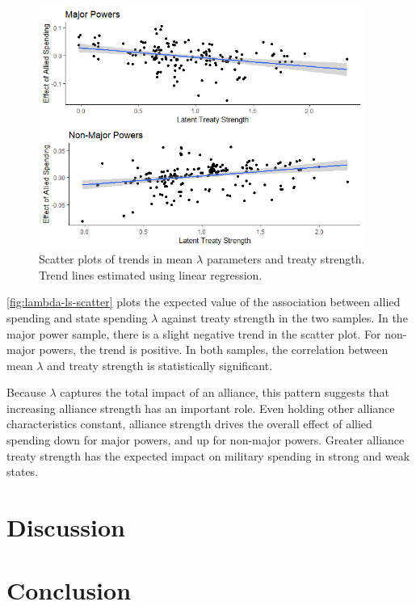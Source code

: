 \documentclass[12pt]{article}
\begin{document}
\begin{figure}[htbp]
	\centering
		\includegraphics[width=0.95\textwidth]{../figures/lambda-ls-scatter.png}
	\caption{Scatter plots of trends in mean $\lambda$ parameters and treaty strength. Trend lines estimated using linear regression. }
	\label{fig:lambda-ls-scatter}
\end{figure}


\autoref{fig:lambda-ls-scatter} plots the expected value of the association between allied spending and state spending $\lambda$ against treaty strength in the two samples. 
In the major power sample, there is a slight negative trend in the scatter plot.
For non-major powers, the trend is positive. 
In both samples, the correlation between mean $\lambda$ and treaty strength is statistically significant. 


Because $\lambda$ captures the total impact of an alliance, this pattern suggests that increasing alliance strength has an important role. 
Even holding other alliance characteristics constant, alliance strength drives the overall effect of allied spending down for major powers, and up for non-major powers. 
Greater alliance treaty strength has the expected impact on military spending in strong and weak states. 


\section{Discussion}










\section{Conclusion}



%  
 
\end{document}
